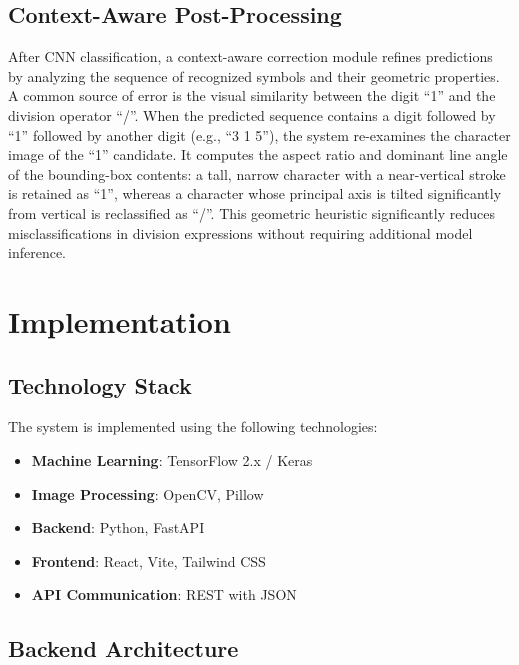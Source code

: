 \documentclass[conference]{IEEEtran}
\begin{document}
\subsection{Context-Aware Post-Processing}

After CNN classification, a context-aware correction module refines predictions by analyzing the sequence of recognized symbols and their geometric properties. A common source of error is the visual similarity between the digit ``1'' and the division operator ``/''. When the predicted sequence contains a digit followed by ``1'' followed by another digit (e.g., ``3 1 5''), the system re-examines the character image of the ``1'' candidate. It computes the aspect ratio and dominant line angle of the bounding-box contents: a tall, narrow character with a near-vertical stroke is retained as ``1'', whereas a character whose principal axis is tilted significantly from vertical is reclassified as ``/''. This geometric heuristic significantly reduces misclassifications in division expressions without requiring additional model inference.

\section{Implementation}

\subsection{Technology Stack}

The system is implemented using the following technologies:

\begin{itemize}
    \item \textbf{Machine Learning}: TensorFlow 2.x / Keras
    \item \textbf{Image Processing}: OpenCV, Pillow
    \item \textbf{Backend}: Python, FastAPI
    \item \textbf{Frontend}: React, Vite, Tailwind CSS
    \item \textbf{API Communication}: REST with JSON
\end{itemize}

\subsection{Backend Architecture}
\end{document}
